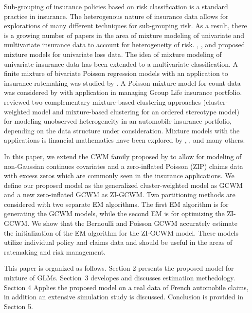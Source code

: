 \documentclass[11pt,letterpaper]{article}
\numberwithin{equation}{section}
\numberwithin{equation}{section}
\numberwithin{equation}{section}
\begin{document}
Sub-grouping of insurance policies based on risk classification is a standard practice in insurance. The heterogenous nature of insurance data allows for explorations of many different techniques for sub-grouping risk. As a result, there is a growing number of papers in the area of mixture modeling of univariate and multivariate insurance data to account for heterogeneity of risk. \cite{Lee+Lin:2010}, \cite{Verbelen+Gong+Antonio+Badescu+Lin:2015}, and \cite{Miljkovic+Grun:2016} proposed mixture models for univariate loss data. The idea of mixture modeling of univariate insurance data has been extended to a multivariate classification. A finite mixture of bivariate Poisson regression models with an application to insurance ratemaking was studied by \cite{Bermudez+Karlis:2012}. A Poisson mixture model for count data was considered by \cite{Brown+Buckley:2015} with application in managing Group Life insurance portfolio. \cite{risks_miljkovic} reviewed two complementary mixture-based clustering approaches (cluster-weighted model and mixture-based clustering for an ordered stereotype model) for modeling unobserved heterogeneity in an automobile insurance portfolio, depending on the data structure under consideration. Mixture models with the applications is financial mathematics have been explored by \cite{durham2007sv}, \cite{miljkovic2018new}, and many others.

In this paper, we extend the CWM family proposed by \cite{Ingrassia+Punzo+Vittadini+Minotti:2015} to allow for modeling of non-Gaussian continues covariates and a zero-inflated Poisson (ZIP) claims data with excess zeros which are commonly seen in the insurance applications. We define our proposed model as the generalized cluster-weighted model as GCWM and a new zero-inflated GCWM as ZI-GCWM. Two partitioning methods are considered with two separate EM algorithms. The first EM algorithm is for generating the GCWM models, while the second EM is for optimizing the ZI-GCWM. We show that the Bernoulli and Poisson GCWM accurately estimate the initialization of the EM algorithm for the ZI-GCWM model. These models utilize individual policy and claims data and should be useful in the areas of ratemaking and risk management.

This paper is organized as follows. Section 2 presents the proposed model for mixture of GLMs. Section~3 developes and discusses estimation methedology. Section 4 Applies the proposed model on a real data of French automobile claims, in addition an extensive simulation study is discussed. Conclusion is provided in Section 5.
\end{document}
